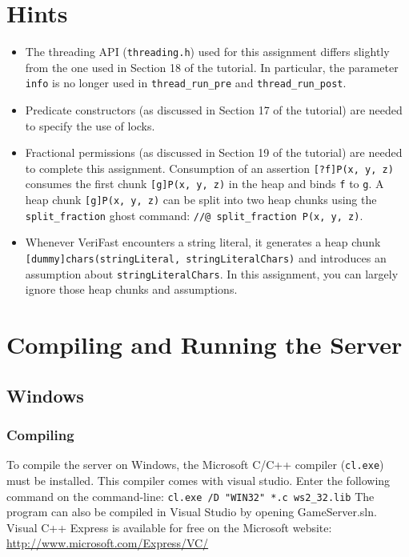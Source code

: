 \documentclass{article}
\begin{document}
\section{Hints}

\begin{itemize}
  \item The threading API (\texttt{threading.h}) used for this assignment differs slightly from the one used in Section 18 of the tutorial. In particular, the parameter \texttt{info} is no longer used in \texttt{thread\_run\_pre} and \texttt{thread\_run\_post}.
  \item Predicate constructors (as discussed in Section 17 of the tutorial) are needed to specify the use of locks.
  \item Fractional permissions (as discussed in Section 19 of the tutorial) are needed to complete this assignment. Consumption of an assertion \texttt{[?f]P(x, y, z)} consumes the first chunk \texttt{[g]P(x, y, z)} in the heap and binds \texttt{f} to \texttt{g}. A heap chunk \texttt{[g]P(x, y, z)} can be split into two heap chunks using the \texttt{split\_fraction} ghost command: \texttt{//@ split\_fraction P(x, y, z)}.
  \item Whenever VeriFast encounters a string literal, it generates a heap chunk \texttt{[dummy]chars(stringLiteral, stringLiteralChars)} and introduces an assumption about \texttt{stringLiteralChars}. In this assignment, you can largely ignore those heap chunks and assumptions.
\end{itemize}

\section{Compiling and Running the Server}

\subsection{Windows}

\subsubsection*{Compiling}
To compile the server on Windows, the Microsoft C/C++ compiler (\texttt{cl.exe}) must be installed. This compiler comes with visual studio. Enter the following command on the command-line:\newline\newline
\texttt{cl.exe /D "WIN32" *.c ws2\_32.lib}\newline\newline
The program can also be compiled in Visual Studio by opening GameServer.sln. Visual C++ Express is available for free on the Microsoft website:\newline\newline
\url{http://www.microsoft.com/Express/VC/}
\end{document}
